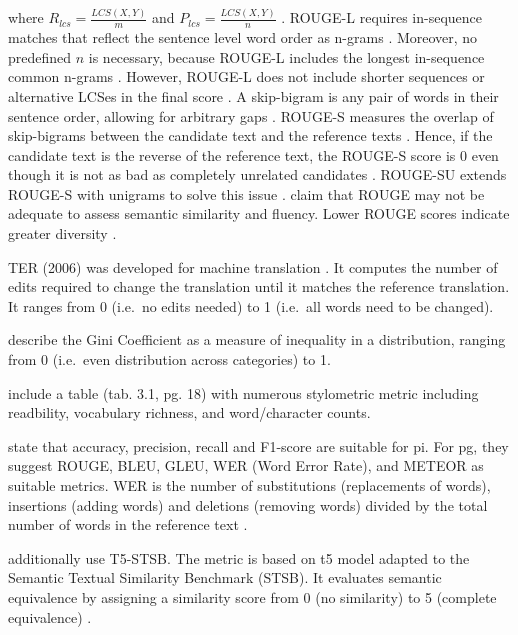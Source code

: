 where $R_{lcs} = \frac{LCS(X,Y)}{m}$ and $P_{lcs} = \frac{LCS(X,Y)}{n}$ \citep{lin_rouge_2004}.
ROUGE-L requires in-sequence matches that reflect the sentence level word order as n-grams \citep{lin_rouge_2004}.
Moreover, no predefined $n$ is necessary, because ROUGE-L includes the longest in-sequence common n-grams \citep{lin_rouge_2004}.
However, ROUGE-L does not include shorter sequences or alternative LCSes in the final score \citep{lin_rouge_2004}.
A skip-bigram is any pair of words in their sentence order, allowing for arbitrary gaps \citep{lin_rouge_2004}.
ROUGE-S measures the overlap of skip-bigrams between the candidate text and the reference texts \citep{lin_rouge_2004}.
Hence, if the candidate text is the reverse of the reference text, the ROUGE-S score is 0 even though it is not as bad as completely unrelated candidates \citep{lin_rouge_2004}.
ROUGE-SU extends ROUGE-S with unigrams to solve this issue \citep{lin_rouge_2004}.
\citet{kurt_pehlivanoglu_comparative_2024} claim that ROUGE may not be adequate to assess semantic similarity and fluency.
Lower ROUGE scores indicate greater diversity \citep{kurt_pehlivanoglu_comparative_2024}.

TER (2006) was developed for machine translation \citep{zhou_paraphrase_2021}.
It computes the number of edits required to change the translation until it matches the reference translation.
It ranges from 0 (i.e.\ no edits needed) to 1 (i.e.\ all words need to be changed).

\citet{fu_learning_2024} describe the Gini Coefficient as a measure of inequality in a distribution, ranging from 0 (i.e.\ even distribution across categories) to 1.

\citet{master_thesis_paraphrasing_2024} include a table (tab. 3.1, pg. 18) with numerous stylometric metric including readbility, vocabulary richness, and word/character counts.

\citet{palivela_optimization_2021} state that accuracy, precision, recall and F1-score are suitable for \ac{pi}.
For \ac{pg}, they suggest ROUGE, BLEU, GLEU, WER (Word Error Rate), and METEOR as suitable metrics.
WER is the number of substitutions (replacements of words), insertions (adding words) and deletions (removing words) 
divided by the total number of words in the reference text \citep{palivela_optimization_2021}.

\citet{kurt_pehlivanoglu_comparative_2024} additionally use T5-STSB.
The metric is based on \ac{t5} model adapted to the Semantic Textual Similarity Benchmark (STSB).
It evaluates semantic equivalence by assigning a similarity score from 0 (no similarity) to 5 (complete equivalence) \citep{kurt_pehlivanoglu_comparative_2024}.

